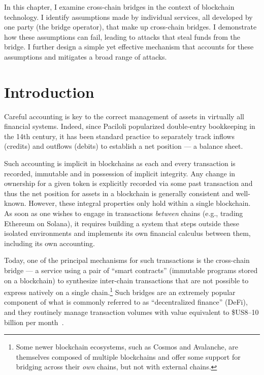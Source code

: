 
In this chapter, I examine cross-chain bridges in the context of blockchain technology. I identify assumptions made by individual services, all developed by one party (the bridge operator), that make up cross-chain bridges.
I demonstrate how these assumptions can fail, leading to attacks that steal funds from the bridge. I further design a simple yet effective mechanism that accounts for these assumptions and mitigates a broad range of attacks.


\section{Introduction}

Careful accounting is key to the correct management of assets in
virtually all financial systems.  Indeed, since Paciloli popularized
double-entry bookkeeping in the 14th century, it has been standard
practice to separately track inflows (credits) and outflows (debits)
to establish a net position --- a balance sheet.

Such accounting is implicit in blockchains as each and every
transaction is recorded, immutable and in possession of implicit
integrity.  Any change in ownership for a given token is explicitly
recorded via some past transaction and thus the net position for
assets in a blockchain is generally consistent and
well-known. However, these integral properties only hold within a
single blockchain.  As soon as one wishes to engage in transactions
\emph{between} chains (e.g., trading Ethereum on Solana), it
requires building a system that steps outside these isolated
environments and implements its own financial calculus between them,
including its own accounting.

Today, one of the principal mechanisms for such transactions is the
cross-chain bridge --- a service using a pair of ``smart contracts''
(immutable programs stored on a blockchain) to synthesize inter-chain
transactions that are not possible to express natively on a single
chain.\footnote{Some newer blockchain ecosystems, such as Cosmos and
  Avalanche, are themselves composed of multiple blockchains and offer
  some support for bridging across their \emph{own} chains, but not with external chains.}  Such bridges are an extremely popular component of what is
commonly referred to as ``decentralized finance'' (DeFi), and they
routinely manage transaction volumes with value equivalent to \$US8--10
billion per month~\cite{defillama-volume}.

